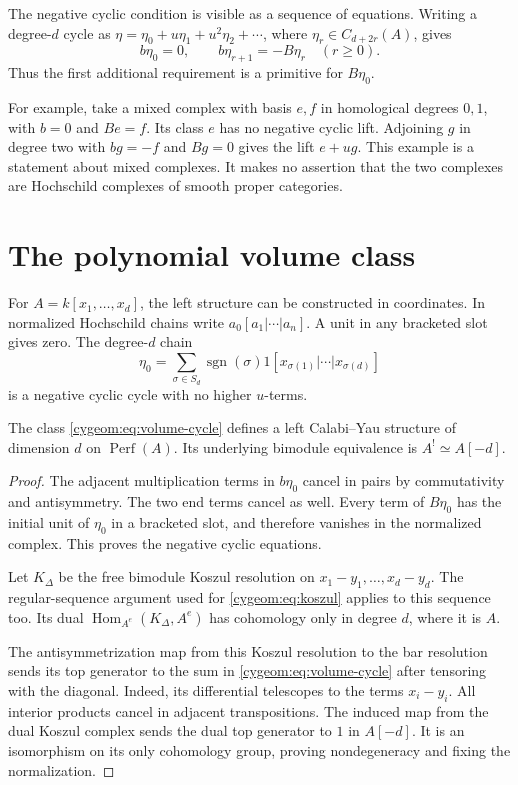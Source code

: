 The negative cyclic condition is visible as a sequence of equations.
Writing a degree-$d$ cycle as
$\eta=\eta_0+u\eta_1+u^2\eta_2+\cdots$, where
$\eta_r\in C_{d+2r}(A)$, gives
\begin{equation}\label{cygeom:eq:lift}
 b\eta_0=0,\qquad b\eta_{r+1}=-B\eta_r\quad(r\geq0).
\end{equation}
Thus the first additional requirement is a primitive for $B\eta_0$.

For example, take a mixed complex with basis $e,f$ in homological degrees
$0,1$, with $b=0$ and $Be=f$. Its class $e$ has no negative cyclic
lift. Adjoining $g$ in degree two with $bg=-f$ and $Bg=0$ gives
the lift $e+ug$. This example is a statement about mixed complexes.
It makes no assertion that the two complexes are Hochschild complexes
of smooth proper categories.

\section{The polynomial volume class}
\label{cygeom:sec:volume}

For $A=k[x_1,\ldots,x_d]$, the left structure can be constructed in
coordinates. In normalized Hochschild chains write
$a_0[a_1|\cdots|a_n]$. A unit in any bracketed slot gives zero.
The degree-$d$ chain
\begin{equation}\label{cygeom:eq:volume-cycle}
 \eta_0=\sum_{\sigma\in S_d}\operatorname{sgn}(\sigma)
       1[x_{\sigma(1)}|\cdots|x_{\sigma(d)}]
\end{equation}
is a negative cyclic cycle with no higher $u$-terms.

\begin{proposition}\label{cygeom:prop:polynomial-cy}
The class \eqref{cygeom:eq:volume-cycle} defines a left Calabi--Yau
structure of dimension $d$ on $\operatorname{Perf}(A)$.
Its underlying bimodule equivalence is $A^!\simeq A[-d]$.
\end{proposition}

\begin{proof}
The adjacent multiplication terms in $b\eta_0$ cancel in pairs by
commutativity and antisymmetry. The two end terms cancel as well.
Every term of $B\eta_0$ has the initial unit of $\eta_0$ in a bracketed
slot, and therefore vanishes in the normalized complex. This proves
the negative cyclic equations.

Let $K_\Delta$ be the free bimodule Koszul resolution on
$x_1-y_1,\ldots,x_d-y_d$. The regular-sequence argument used for
\eqref{cygeom:eq:koszul} applies to this sequence too. Its dual
$\operatorname{Hom}_{A^e}(K_\Delta,A^e)$ has cohomology only in degree
$d$, where it is $A$.

The antisymmetrization map from this Koszul
resolution to the bar resolution sends its top generator to the sum
in \eqref{cygeom:eq:volume-cycle} after tensoring with the diagonal.
Indeed, its differential telescopes to the terms $x_i-y_i$. All
interior products cancel in adjacent transpositions. The induced map
from the dual Koszul complex sends the dual top generator to $1$ in
$A[-d]$. It is an isomorphism on its only cohomology group, proving
nondegeneracy and fixing the normalization.
\end{proof}

